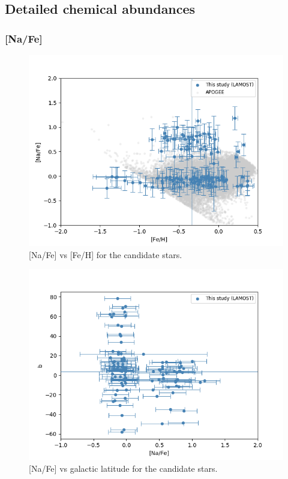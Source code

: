 \documentclass[a4paper,fleqn,usenatbib]{mnras}
\begin{document}
\subsection{Detailed chemical abundances}
\label{sec:abundances}

\subsubsection{[Na/Fe]}

\begin{figure}
	\includegraphics[width=\columnwidth]{NavsFeh.png}
    \caption{[Na/Fe] vs [Fe/H] for the candidate stars.}
    \label{NavsFeh}
\end{figure}

\begin{figure}
	\includegraphics[width=\columnwidth]{Navsb.png}
    \caption{[Na/Fe] vs galactic latitude for the candidate stars.}
    \label{Navsb}
\end{figure}
\end{document}
